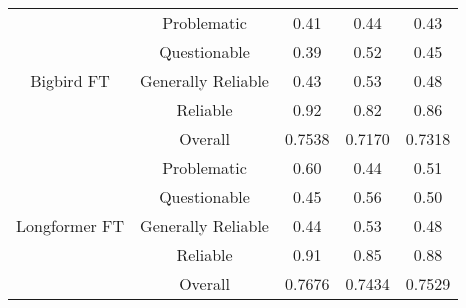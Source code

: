 \begin{table}[htbp]
\begin{tabular}{| c | c | c | c | c |}
        \multirow{5}{*}{Bigbird FT}                       & Problematic        & 0.41               & 0.44            & 0.43            \\
                                                          & Questionable       & 0.39               & 0.52            & 0.45            \\
                                                          & Generally Reliable & 0.43               & 0.53            & 0.48            \\
                                                          & Reliable           & 0.92               & 0.82            & 0.86            \\\cline{2-5}
                                                          & Overall            & 0.7538             & 0.7170          & 0.7318          \\
        \hline
        \multirow{5}{*}{Longformer FT}                    & Problematic        & 0.60               & 0.44            & 0.51            \\
                                                          & Questionable       & 0.45               & 0.56            & 0.50            \\
                                                          & Generally Reliable & 0.44               & 0.53            & 0.48            \\
                                                          & Reliable           & 0.91               & 0.85            & 0.88            \\\cline{2-5}
                                                          & Overall            & 0.7676             & 0.7434          & 0.7529          \\
        \hline

\end{tabular}
\end{table}
